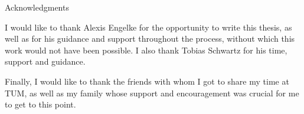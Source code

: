 \thispagestyle{empty}

\vspace*{20mm}

\begin{center}
    { Acknowledgments}
\end{center}

\vspace{10mm}

I would like to thank Alexis Engelke for the opportunity to write this thesis, as well as for his guidance and support throughout the process, without which this work would not have been possible. I also thank Tobias Schwartz for his time, support and guidance. 

Finally, I would like to thank the friends with whom I got to share my time at TUM, as well as my family whose support and encouragement was crucial for me to get to this point.

\cleardoublepage{}
